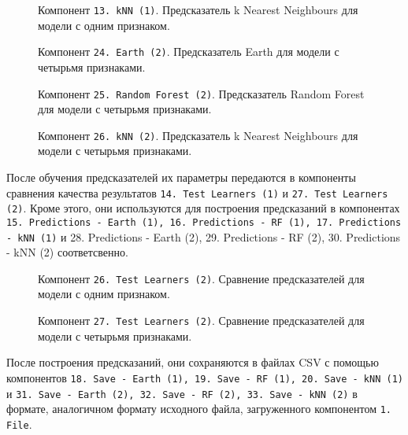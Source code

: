 \begin{figure}[H]
    \caption{Компонент \texttt{13. kNN (1)}. Предсказатель k Nearest Neighbours для модели с одним признаком.}
    \label{img:13-kNN-1}
\end{figure}

\begin{figure}[H]
    \caption{Компонент \texttt{24. Earth (2)}. Предсказатель Earth для модели с четырьмя признаками.}
    \label{img:24-Earth-2}
\end{figure}

\begin{figure}[H]
    \center{\texttt{[image: 25-RF-2]}}
    \caption{Компонент \texttt{25. Random Forest (2)}. Предсказатель Random Forest для модели с четырьмя признаками.}
    \label{img:25-RF-2}
\end{figure}

\begin{figure}[H]
    \caption{Компонент \texttt{26. kNN (2)}. Предсказатель k Nearest Neighbours для модели с четырьмя признаками.}
    \label{img:26-kNN-2}
\end{figure}

После обучения предсказателей их параметры передаются в компоненты сравнения качества результатов \texttt{14. Test Learners (1)} и \texttt{27. Test Learners (2)}. Кроме этого, они используются для построения предсказаний в компонентах \texttt{15. Predictions - Earth (1), 16. Predictions - RF (1), 17. Predictions - kNN (1)} и {28. Predictions - Earth (2), 29. Predictions - RF (2), 30. Predictions - kNN (2)} соответсвенно.

\begin{figure}[H]
    \caption{Компонент \texttt{26. Test Learners (2)}. Сравнение предсказателей для модели с одним признаком.}
    \label{img:14-Test-Learners-1}
\end{figure}

\begin{figure}[H]
    \caption{Компонент \texttt{27. Test Learners (2)}. Сравнение предсказателей для модели с четырьмя признаками.}
    \label{img:27-Test-Learners-2}
\end{figure}

После построения предсказаний, они сохраняются в файлах CSV с помощью компонентов \texttt{18. Save - Earth (1), 19. Save - RF (1), 20. Save - kNN (1)} и \texttt{31. Save - Earth (2), 32. Save - RF (2), 33. Save - kNN (2)} в формате, аналогичном формату исходного файла, загруженного компонентом \texttt{1. File}.

